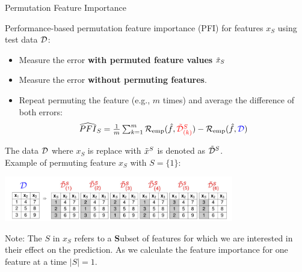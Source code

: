 \documentclass[11pt,compress,t,notes=noshow, xcolor=table]{beamer}
\begin{document}
\begin{vbframe}{Permutation Feature Importance}
\normalsize

Performance-based permutation feature importance (PFI) for features $x_S$ using test data $\D$:
\begin{itemize}
  \item Measure the error \color{red}\textbf{with permuted feature values} \color{black} $\pert{x}{}{}_S$
  \item Measure the error \color{blue}\textbf{without permuting features}\color{black}.
  \item Repeat permuting the feature (e.g., $m$ times) and average the difference of both errors: 
$$\widehat{PFI}_S = \tfrac{1}{m} \textstyle\sum\nolimits_{k = 1}^{m} \riske (\fh, {\color{red}\pert{\D}{S}{}_{(k)}}) - \riske (\fh, {\color{blue}\D})$$
\end{itemize}

The data $\D$ where $x_S$ is replace with $\pert{x}{S}{}$ is denoted as $\pert{\D}{S}{}$.\\
Example of permuting feature $x_S$ with $S = \{1\}$:

\begin{center}
\includegraphics[width=0.75\textwidth]{figure_man/permuted-fv.pdf}
\end{center}

\vspace*{0.2cm}
{\scriptsize{Note: 
The $S$ in $x_S$ refers to a \textbf{S}ubset of features for which we are interested in their effect on the prediction.
As we calculate the feature importance for one feature at a time $|S| = 1$.}\par}

\end{vbframe}
\end{document}
